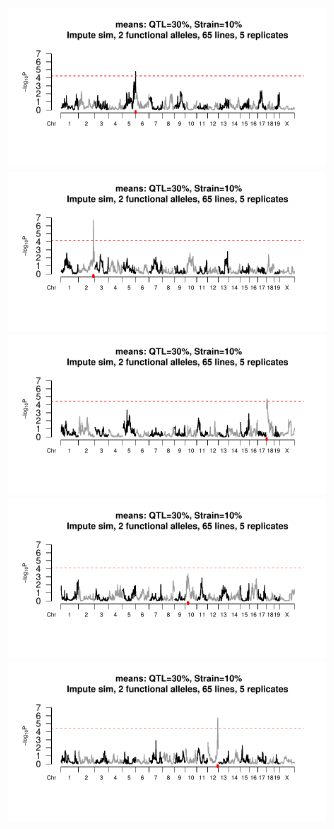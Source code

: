 \begin{figure}[h]
\renewcommand{\familydefault}{\sfdefault}\normalfont
\centering
\includegraphics[width=0.75\textwidth, trim={0in 0.9in 0in 0.8in}, clip]{figures/3-sparcc/sample_scan1.pdf}
\includegraphics[width=0.75\textwidth, trim={0in 0.9in 0in 0.8in}, clip]{figures/3-sparcc/sample_scan2.pdf}
\includegraphics[width=0.75\textwidth, trim={0in 0.9in 0in 0.8in}, clip]{figures/3-sparcc/sample_scan3.pdf}
\includegraphics[width=0.75\textwidth, trim={0in 0.9in 0in 0.8in}, clip]{figures/3-sparcc/sample_scan4.pdf}
\includegraphics[width=0.75\textwidth, trim={0in 0.7in 0in 0.8in}, clip]{figures/3-sparcc/sample_scan5.pdf}

\end{figure}
